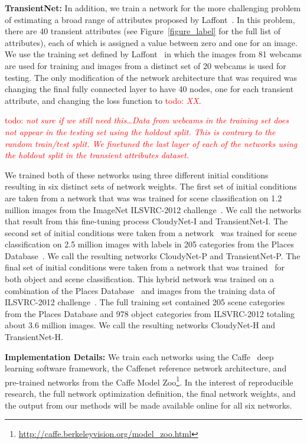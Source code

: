 \documentclass{article}
\newcommand{\todo}[1]{\textcolor{red}{todo: {\em #1}}}
\begin{document}
\textbf{TransientNet:} In addition, we train a network for the more
challenging problem of estimating a broad range of attributes proposed
by Laffont~\cite{Laffont14}.  In this problem, there are 40 transient
attributes (see Figure~\ref{figure_label} for the full list of
attributes), each of which is assigned a value between zero and one
for an image. We use the training set defined by
Laffont~\cite{Laffont14} in which the images from 81 webcams are used
for training and images from a distinct set of 20 webcams is used for
testing.  The only modification of the network architecture that was
required was changing the final fully connected layer to have 40
nodes, one for each transient attribute, and changing the loss
function to \todo{XX}. 

\todo{not sure if we still need this\dots Data from webcams in the
training set does not appear in the testing set using the holdout
split.  This is contrary to the random train/test split.  We finetuned
the last layer of each of the networks using the holdout split in the
transient attributes dataset.}

We trained both of these networks using three different initial
conditions resulting in six distinct sets of network weights. The
first set of initial conditions are taken from a network that was was
trained for scene classification on 1.2 million images from the
ImageNet ILSVRC-2012 challenge~\cite{ILSVRCarxiv14}.  We call the
networks that result from this fine-tuning process CloudyNet-I and
TransientNet-I.  The second set of initial conditions were taken from
a network~\cite{zhou2014places} was trained for scene classification
on 2.5 million images with labels in 205 categories from the Places
Database~\cite{zhou2014places}. We call the resulting networks
CloudyNet-P and TransientNet-P.  The final set of initial conditions
were taken from a network that was trained~\cite{zhou2014places} for
both object and scene classification.  This hybrid network was trained
on a combination of the Places Database~\cite{zhou2014places} and
images from the training data of ILSVRC-2012
challenge~\cite{ILSVRCarxiv14}.  The full training set contained 205
scene categories from the Places Database and 978 object categories
from ILSVRC-2012 totaling about 3.6 million images.  We call the
resulting networks CloudyNet-H and TransientNet-H.

\textbf{Implementation Details:} We train each networks using the
Caffe~\cite{caffe14} deep learning software framework, the Caffenet
reference network architecture, and pre-trained networks from the
Caffe Model
Zoo\footnote{\url{http://caffe.berkeleyvision.org/model_zoo.html}}.
In the interest of reproducible research, the full network
optimization definition, the final network weights, and the output
from our methods will be made available online for all six networks.
\end{document}
